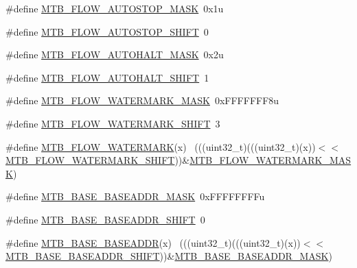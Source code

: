 \begin{DoxyCompactItemize}
\item 
\#define \hyperlink{group___m_t_b___register___masks_ga9a44f1be981682cb9519f33e95b94644}{M\+T\+B\+\_\+\+F\+L\+O\+W\+\_\+\+A\+U\+T\+O\+S\+T\+O\+P\+\_\+\+M\+A\+SK}~0x1u
\item 
\#define \hyperlink{group___m_t_b___register___masks_gacd0f126527ae40477d013b771e5103ee}{M\+T\+B\+\_\+\+F\+L\+O\+W\+\_\+\+A\+U\+T\+O\+S\+T\+O\+P\+\_\+\+S\+H\+I\+FT}~0
\item 
\#define \hyperlink{group___m_t_b___register___masks_ga6be5a7f0961e0862f4d2d270f0524a51}{M\+T\+B\+\_\+\+F\+L\+O\+W\+\_\+\+A\+U\+T\+O\+H\+A\+L\+T\+\_\+\+M\+A\+SK}~0x2u
\item 
\#define \hyperlink{group___m_t_b___register___masks_ga6791ae220dbaca3c5866b664c56c0b56}{M\+T\+B\+\_\+\+F\+L\+O\+W\+\_\+\+A\+U\+T\+O\+H\+A\+L\+T\+\_\+\+S\+H\+I\+FT}~1
\item 
\#define \hyperlink{group___m_t_b___register___masks_ga381f94c6e6980a65bb9fbc594dd688bd}{M\+T\+B\+\_\+\+F\+L\+O\+W\+\_\+\+W\+A\+T\+E\+R\+M\+A\+R\+K\+\_\+\+M\+A\+SK}~0x\+F\+F\+F\+F\+F\+F\+F8u
\item 
\#define \hyperlink{group___m_t_b___register___masks_ga0307292719da2a56557ce153eada2315}{M\+T\+B\+\_\+\+F\+L\+O\+W\+\_\+\+W\+A\+T\+E\+R\+M\+A\+R\+K\+\_\+\+S\+H\+I\+FT}~3
\item 
\#define \hyperlink{group___m_t_b___register___masks_ga86a7fb458f49ef3d08ddea6fbccd883c}{M\+T\+B\+\_\+\+F\+L\+O\+W\+\_\+\+W\+A\+T\+E\+R\+M\+A\+RK}(x)                                    ~(((uint32\+\_\+t)(((uint32\+\_\+t)(x))$<$$<$\hyperlink{group___m_t_b___register___masks_ga0307292719da2a56557ce153eada2315}{M\+T\+B\+\_\+\+F\+L\+O\+W\+\_\+\+W\+A\+T\+E\+R\+M\+A\+R\+K\+\_\+\+S\+H\+I\+FT}))\&\hyperlink{group___m_t_b___register___masks_ga381f94c6e6980a65bb9fbc594dd688bd}{M\+T\+B\+\_\+\+F\+L\+O\+W\+\_\+\+W\+A\+T\+E\+R\+M\+A\+R\+K\+\_\+\+M\+A\+SK})
\item 
\#define \hyperlink{group___m_t_b___register___masks_ga9aabef14f0b7a38e25f049f289273193}{M\+T\+B\+\_\+\+B\+A\+S\+E\+\_\+\+B\+A\+S\+E\+A\+D\+D\+R\+\_\+\+M\+A\+SK}~0x\+F\+F\+F\+F\+F\+F\+F\+Fu
\item 
\#define \hyperlink{group___m_t_b___register___masks_gaaa4c5bd3736221b3c88252a206a4b716}{M\+T\+B\+\_\+\+B\+A\+S\+E\+\_\+\+B\+A\+S\+E\+A\+D\+D\+R\+\_\+\+S\+H\+I\+FT}~0
\item 
\#define \hyperlink{group___m_t_b___register___masks_gaadfdc674a6322fe080c1f41f1017b857}{M\+T\+B\+\_\+\+B\+A\+S\+E\+\_\+\+B\+A\+S\+E\+A\+D\+DR}(x)                                      ~(((uint32\+\_\+t)(((uint32\+\_\+t)(x))$<$$<$\hyperlink{group___m_t_b___register___masks_gaaa4c5bd3736221b3c88252a206a4b716}{M\+T\+B\+\_\+\+B\+A\+S\+E\+\_\+\+B\+A\+S\+E\+A\+D\+D\+R\+\_\+\+S\+H\+I\+FT}))\&\hyperlink{group___m_t_b___register___masks_ga9aabef14f0b7a38e25f049f289273193}{M\+T\+B\+\_\+\+B\+A\+S\+E\+\_\+\+B\+A\+S\+E\+A\+D\+D\+R\+\_\+\+M\+A\+SK})

\end{DoxyCompactItemize}
